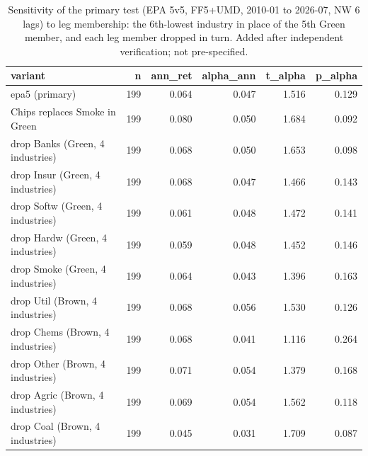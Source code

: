 \begin{table}
\caption{Sensitivity of the primary test (EPA 5v5, FF5+UMD, 2010-01 to 2026-07, NW 6 lags) to leg membership: the 6th-lowest industry in place of the 5th Green member, and each leg member dropped in turn. Added after independent verification; not pre-specified.}
\label{tab:m4_sensitivity}
\begin{tabular}{lrrrrr}
\toprule
variant & n & ann\_ret & alpha\_ann & t\_alpha & p\_alpha \\
\midrule
epa5 (primary) & 199 & 0.064 & 0.047 & 1.516 & 0.129 \\
Chips replaces Smoke in Green & 199 & 0.080 & 0.050 & 1.684 & 0.092 \\
drop Banks (Green, 4 industries) & 199 & 0.068 & 0.050 & 1.653 & 0.098 \\
drop Insur (Green, 4 industries) & 199 & 0.068 & 0.047 & 1.466 & 0.143 \\
drop Softw (Green, 4 industries) & 199 & 0.061 & 0.048 & 1.472 & 0.141 \\
drop Hardw (Green, 4 industries) & 199 & 0.059 & 0.048 & 1.452 & 0.146 \\
drop Smoke (Green, 4 industries) & 199 & 0.064 & 0.043 & 1.396 & 0.163 \\
drop Util (Brown, 4 industries) & 199 & 0.068 & 0.056 & 1.530 & 0.126 \\
drop Chems (Brown, 4 industries) & 199 & 0.068 & 0.041 & 1.116 & 0.264 \\
drop Other (Brown, 4 industries) & 199 & 0.071 & 0.054 & 1.379 & 0.168 \\
drop Agric (Brown, 4 industries) & 199 & 0.069 & 0.054 & 1.562 & 0.118 \\
drop Coal (Brown, 4 industries) & 199 & 0.045 & 0.031 & 1.709 & 0.087 \\
\bottomrule
\end{tabular}
\end{table}
